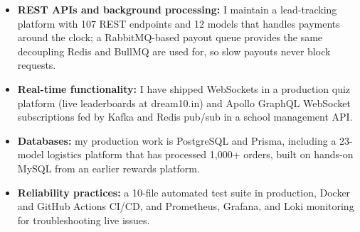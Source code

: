 \documentclass[]{cover}
\begin{document}


\currentdate{\today}



{\raggedright{}\fontsize{11pt}{13pt}\selectfont
\renewcommand{\labelitemi}{\textbullet}
\renewcommand{\labelitemii}{\textbullet}
\renewcommand{\labelitemiii}{\textbullet}
\begin{itemize}
    \item \textbf{REST APIs and background processing:} I maintain a lead-tracking platform with 107 REST endpoints and 12 models that handles payments around the clock; a RabbitMQ-based payout queue provides the same decoupling Redis and BullMQ are used for, so slow payouts never block requests.
    \item \textbf{Real-time functionality:} I have shipped WebSockets in a production quiz platform (live leaderboards at dream10.in) and Apollo GraphQL WebSocket subscriptions fed by Kafka and Redis pub/sub in a school management API.
    \item \textbf{Databases:} my production work is PostgreSQL and Prisma, including a 23-model logistics platform that has processed 1,000+ orders, built on hands-on MySQL from an earlier rewards platform.
    \item \textbf{Reliability practices:} a 10-file automated test suite in production, Docker and GitHub Actions CI/CD, and Prometheus, Grafana, and Loki monitoring for troubleshooting live issues.
\end{itemize}\par}
\end{document}
